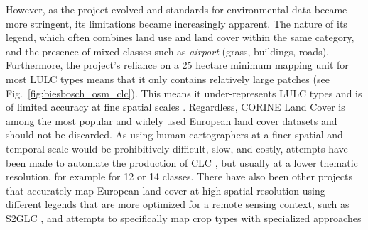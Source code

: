         However, as the project evolved and standards for environmental data became more stringent, its limitations became increasingly apparent. 
        The nature of its legend, which often combines land use and land cover within the same category, and the presence of mixed classes such as \textit{airport} (grass, buildings, roads).
        Furthermore, the project's reliance on a 25 hectare minimum mapping unit for most LULC types means that it only contains relatively large patches (see Fig.\@~\ref{fig:biesbosch_osm_clc}). This means it under-represents LULC types and is of limited accuracy at fine spatial scales \citep{buttner2014corine,aune2021content, pflugmacher2019mapping}. Regardless, CORINE Land Cover is among the most popular and widely used European land cover datasets and should not be discarded. As using human cartographers at a finer spatial and temporal scale would be prohibitively difficult, slow, and costly, attempts have been made to automate the production of CLC \citep{buttner2014corine}, but usually at a lower thematic resolution, for example for 12 \citep{pflugmacher2019mapping} or 14 \citep{bhugra2022rapidai4eo} classes. There have also been other projects that accurately map European land cover at high spatial resolution using different legends that are more optimized for a remote sensing context, such as S2GLC \citep{malinowski2020}, and attempts to specifically map crop types with specialized approaches \citep{dandrimont2021parcel,luo2022developing}

